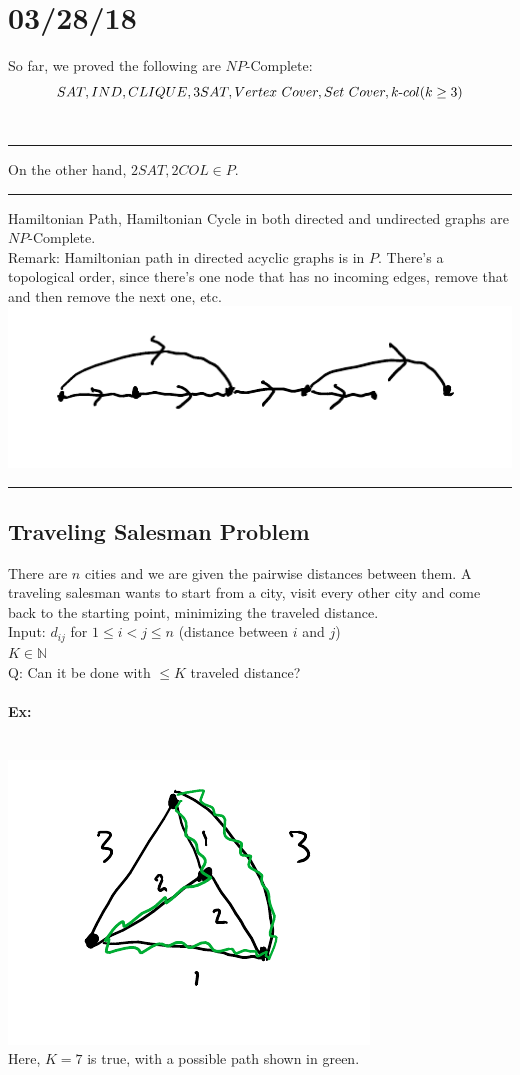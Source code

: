 \documentclass[12 pt]{article}
\begin{document}
          \section{03/28/18}
          So far, we proved the following are $NP$-Complete: $$SAT,
          IND, CLIQUE, 3SAT, Vertex \ Cover, Set \ Cover, k\hbox{-}col
          (k\geq 3)$$
          \\ \noindent \rule{\textwidth}{0.5pt}
          On the other hand, $2SAT, 2COL \in P$.
          \\ \noindent \rule{\textwidth}{0.5pt}
          Hamiltonian Path, Hamiltonian Cycle in both directed and
          undirected graphs are $NP$-Complete.
          \\ Remark: Hamiltonian path in directed acyclic graphs is in
          $P$. There's a topological order, since there's one node
          that has no incoming edges, remove that and then remove the
          next one, etc.
          \\ \includegraphics[width=.9\textwidth]{i142.pdf}
          \\ \noindent \rule{\textwidth}{0.5pt}
          \subsection{Traveling Salesman Problem}
          There are $n$ cities and we are given the pairwise distances
          between them. A traveling salesman wants to start from a
          city, visit every other city and come back to the starting
          point, minimizing the traveled distance.
          \\ Input: $d_{ij}$ for $1\leq i < j \leq n$ (distance
          between $i$ and $j$)
          \\ \phantom{Input:} $K \in \mathbb{N}$
          \\ Q: Can it be done with $\leq K$ traveled distance?
          \paragraph{Ex:}~\\
          \includegraphics[width=.45\textwidth]{i143.pdf}
          \\ Here, $K=7$ is true, with a possible path shown in green.
\end{document}
